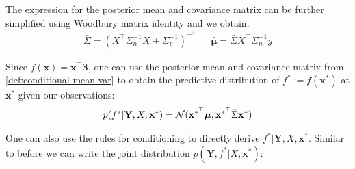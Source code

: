 The expression for the posterior mean and covariance matrix can be further simplified using Woodbury matrix identity
and we obtain:
\begin{align}\label{def:conditional-mean-var}
    \bar{\Sigma} = (X^{\top}\Sigma_n^{-1}X + \Sigma_p^{-1})^{-1} & & \bar{\boldsymbol{\mu}} = \bar{\Sigma} X^{\top} \Sigma_n^{-1} y
\end{align}

Since $f(\mathbf{x}) = \mathbf{x}^{\top}\boldsymbol{\beta}$, one can use the posterior mean and covariance matrix from
\ref{def:conditional-mean-var} to obtain the predictive distribution of $f^{\ast} := f(\mathbf{x}^{\ast})$ at $\mathbf{x}^{\ast}$
given our observations:
\begin{align}\label{def:predictive-dist}
    p(f^{\ast} | \mathbf{Y}, X, \mathbf{x}^{\ast}) = \operatorname{\mathcal{N}}(\mathbf{x}^{\ast^{\top}} \bar{\boldsymbol{\mu}}, \mathbf{x}^{\ast^{\top}} \bar{\Sigma} \mathbf{x}^{\ast}) \\
\end{align}

One can also use the rules for conditioning to directly derive $f^{\ast} | \mathbf{Y}, X, \mathbf{x}^{\ast}$.
Similar to before we can write the joint distribution $p(\mathbf{Y}, f^{\ast}| X, \mathbf{x}^{\ast})$:

